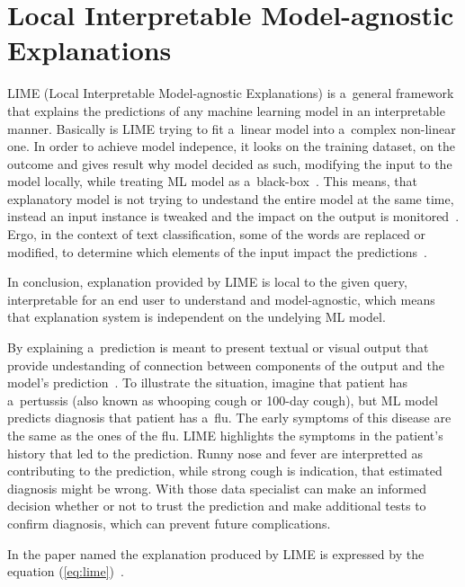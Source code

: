 \section{Local Interpretable Model-agnostic Explanations}\label{sec:explainer}

LIME (Local Interpretable Model-agnostic Explanations) is a~general framework that explains the predictions of any machine learning model in an interpretable manner.
Basically is LIME trying to fit a~linear model into a~complex non-linear one.
In order to achieve model indepence, it looks on the training dataset, on the outcome and gives result why model decided as such, modifying the input to the model locally, while treating ML model as a~black-box~\cite{lime}.
This means, that explanatory model is not trying to undestand the entire model at the same time, instead an input instance is tweaked and the impact on the output is monitored~\cite{article:interpretability-in-machine-learning}.
Ergo, in the context of text classification, some of the words are replaced or modified, to determine which elements of the input impact the predictions~\cite{article:interpretability-in-machine-learning}.

In conclusion, explanation provided by LIME is local to the given query, interpretable for an end user to understand and model-agnostic, which means that explanation system is independent on the undelying ML model.

By explaining a~prediction is meant to present textual or visual output that provide undestanding of connection between components of the output and the model's prediction~\cite{lime}.
To illustrate the situation, imagine that patient has a~pertussis (also known as whooping cough or 100-day cough), but ML model predicts diagnosis that patient has a~flu.
The early symptoms of this disease are the same as the ones of the flu.
LIME highlights the symptoms in the patient’s history that led to the prediction.
Runny nose and fever are interpretted as contributing to the  prediction, while strong cough is indication, that estimated diagnosis might be wrong.
With those data specialist can make an informed decision whether or not to trust the prediction and make additional tests to confirm diagnosis, which can prevent future complications.

In the paper named \textit{} the explanation produced by LIME is expressed by the equation (\ref{eq:lime})~\cite{lime}.

